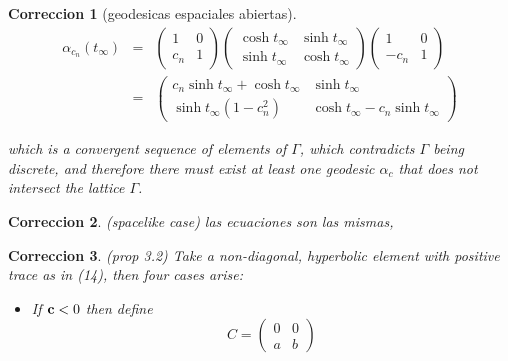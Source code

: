 \documentclass[11pt]{amsart}
\newtheorem{correccion}{Correccion}
\theoremstyle{plain}
\theoremstyle{definition}
\theoremstyle{remark}
\begin{document}
\begin{correccion}[geodesicas espaciales abiertas]
\begin{eqnarray*}
    \alpha_{c_n}(t_\infty) &=& \left( \begin{matrix} 1 & 0 \\ c_n & 1  \end{matrix} \right) \left( \begin{matrix} \cosh{t_\infty} & \sinh{t_\infty} \\ \sinh{t_\infty} & \cosh{t_\infty}  \end{matrix} \right) \left( \begin{matrix} 1 & 0 \\ -c_n & 1  \end{matrix} \right) \\
    &=& \left( \begin{matrix} c_n \sinh{t_\infty} + \cosh{t_\infty} & \sinh{t_\infty} \\ \sinh{t_\infty} (1 - c_{n}^2) & \cosh{t_\infty} - c_n \sinh{t_\infty}  \end{matrix} \right)
\end{eqnarray*}

which is a convergent sequence of elements of $\Gamma$, which contradicts $\Gamma$ being discrete, and therefore there must exist at least one geodesic $\alpha_c$ that does not intersect the lattice $\Gamma$.


\end{correccion}

\begin{correccion}(spacelike case)
las ecuaciones son las mismas, 

\end{correccion}

\begin{correccion}(prop 3.2)
Take a non-diagonal, hyperbolic element with positive trace as in (14), then four cases arise:
\begin{itemize}
    \item If $\bold{c} < 0$ then define $$C = \left( \begin{matrix} 0 & 0 \\ a & b \end{matrix} \right)  $$
\end{itemize}

\end{correccion}




\newpage
\end{document}
